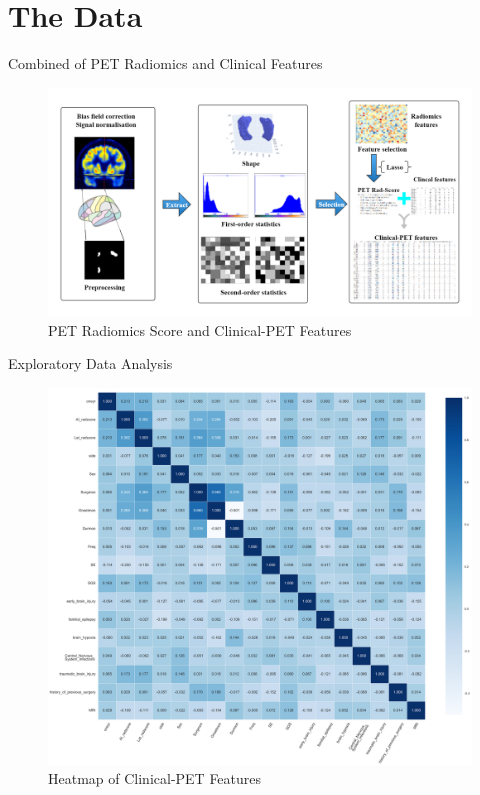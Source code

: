 \documentclass[
  10pt,
  ignorenonframetext,
  fontset=fandol]{beamer}
\begin{document}
\hypertarget{the-data}{%
\section{The Data}\label{the-data}}

\begin{frame}{Combined of PET Radiomics and Clinical Features}
\protect\hypertarget{combined-of-pet-radiomics-and-clinical-features}{}
\begin{figure}

{\centering \includegraphics[width=1.1\linewidth]{images/PET_radiomics} 

}

\caption{PET Radiomics  Score and Clinical-PET Features}\label{fig:unnamed-chunk-4}
\end{figure}
\end{frame}

\begin{frame}{Exploratory Data Analysis}
\protect\hypertarget{exploratory-data-analysis}{}
\begin{figure}

{\centering \includegraphics[width=0.6\linewidth]{images/heatplot} 

}

\caption{Heatmap of Clinical-PET Features}\label{fig:unnamed-chunk-5}
\end{figure}
\end{frame}
\end{document}
